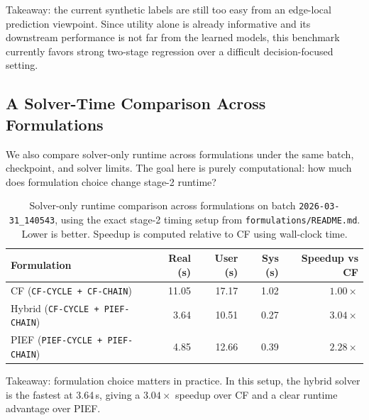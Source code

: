 \documentclass{article}
\begin{document}
Takeaway: the current synthetic labels are still too easy from an edge-local prediction viewpoint. Since utility alone is already informative and its downstream performance is not far from the learned models, this benchmark currently favors strong two-stage regression over a difficult decision-focused setting.

\subsection{A Solver-Time Comparison Across Formulations}
We also compare solver-only runtime across formulations under the same batch, checkpoint, and solver limits. The goal here is purely computational: how much does formulation choice change stage-2 runtime?

\begin{table}[t]
\centering
\small
\setlength{\tabcolsep}{5pt}
\caption{Solver-only runtime comparison across formulations on batch \texttt{2026-03-31\_140543}, using the exact stage-2 timing setup from \texttt{formulations/README.md}. Lower is better. Speedup is computed relative to CF using wall-clock time.}
\label{tab:solver-speed}
\begin{tabular}{@{}lrrrr@{}}
\toprule
\textbf{Formulation} & \textbf{Real (s)} & \textbf{User (s)} & \textbf{Sys (s)} & \textbf{Speedup vs CF} \\
\midrule
CF (\texttt{CF-CYCLE + CF-CHAIN}) & 11.05 & 17.17 & 1.02 & \(1.00\times\) \\
Hybrid (\texttt{CF-CYCLE + PIEF-CHAIN}) & 3.64 & 10.51 & 0.27 & \(3.04\times\) \\
PIEF (\texttt{PIEF-CYCLE + PIEF-CHAIN}) & 4.85 & 12.66 & 0.39 & \(2.28\times\) \\
\bottomrule
\end{tabular}
\end{table}

Takeaway: formulation choice matters in practice. In this setup, the hybrid solver is the fastest at 3.64\,s, giving a \(3.04\times\) speedup over CF and a clear runtime advantage over PIEF.



\end{document}
